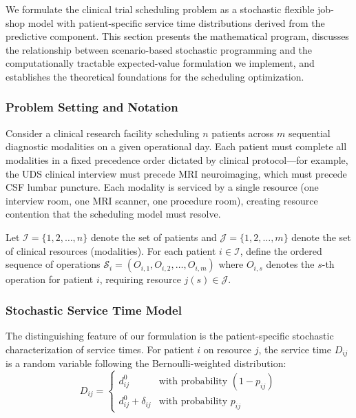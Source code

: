 \documentclass[11pt,a4paper]{article}
\begin{document}
We formulate the clinical trial scheduling problem as a stochastic flexible job-shop model with patient-specific service time distributions derived from the predictive component. This section presents the mathematical program, discusses the relationship between scenario-based stochastic programming and the computationally tractable expected-value formulation we implement, and establishes the theoretical foundations for the scheduling optimization.

\subsubsection{Problem Setting and Notation}

Consider a clinical research facility scheduling $n$ patients across $m$ sequential diagnostic modalities on a given operational day. Each patient must complete all modalities in a fixed precedence order dictated by clinical protocol---for example, the UDS clinical interview must precede MRI neuroimaging, which must precede CSF lumbar puncture. Each modality is serviced by a single resource (one interview room, one MRI scanner, one procedure room), creating resource contention that the scheduling model must resolve.

Let $\mathcal{I} = \{1, 2, \ldots, n\}$ denote the set of patients and $\mathcal{J} = \{1, 2, \ldots, m\}$ denote the set of clinical resources (modalities). For each patient $i \in \mathcal{I}$, define the ordered sequence of operations $\mathcal{S}_i = (O_{i,1}, O_{i,2}, \ldots, O_{i,m})$ where $O_{i,s}$ denotes the $s$-th operation for patient $i$, requiring resource $j(s) \in \mathcal{J}$.

\subsubsection{Stochastic Service Time Model}

The distinguishing feature of our formulation is the patient-specific stochastic characterization of service times. For patient $i$ on resource $j$, the service time $D_{ij}$ is a random variable following the Bernoulli-weighted distribution:
\begin{equation}
D_{ij} = 
\begin{cases}
d_{ij}^0 & \text{with probability } (1 - p_{ij}) \\
d_{ij}^0 + \delta_{ij} & \text{with probability } p_{ij}
\end{cases}
\label{eq:service_time_rv}
\end{equation}
\end{document}
